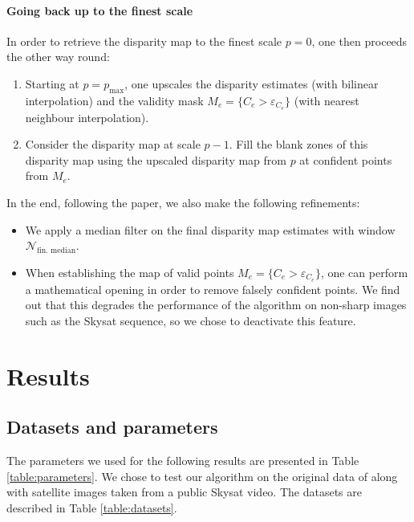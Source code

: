 \documentclass{article}
\theoremstyle{definition}
\begin{document}
\paragraph{Going back up to the finest scale} In order to retrieve the disparity map to the finest scale $p=0$, one then proceeds the other way round:
\begin{enumerate}
 \item Starting at $p=p_{\max}$, one upscales the disparity estimates (with bilinear interpolation) and the validity mask $M_e = \{C_e > \varepsilon_{C_e}\}$ (with nearest neighbour interpolation).
 \item Consider the disparity map at scale $p-1$. Fill the blank zones of this disparity map using the upscaled disparity map from $p$ at confident points from $M_e$.
\end{enumerate}


In the end, following the paper, we also make the following refinements:
\begin{itemize}
 \item We apply a median filter on the final disparity map estimates with window $\mathcal{N}_\text{fin. median}$.
 \item When establishing the map of valid points $M_e = \{C_e > \varepsilon_{C_e}\}$, one can perform a mathematical opening in order to remove falsely confident points. We find out that this degrades the performance of the algorithm on non-sharp images such as the Skysat sequence, so we chose to deactivate this feature.
\end{itemize}


\clearpage
\section{Results} \label{sec:results}


\subsection{Datasets and parameters} \label{subsec:dataset_params}


The parameters we used for the following results are presented in Table \ref{table:parameters}. We chose to test our algorithm on the original data of \cite{art:kim13:lfields} along with satellite images taken from a public Skysat video. The datasets are described in Table \ref{table:datasets}.
\end{document}
